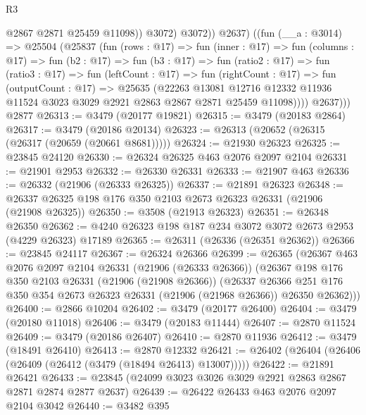 \begin{lexlean}{R3}
\begin{coremodule}
                  @2867
                  @2871
                  @25459
                  @11098))
              @3072)
            @3072))
          @2637)
        ((fun (__a : @3014) =>
        @25504
          (@25837
            (fun (rows : @17) =>
            fun (inner : @17) =>
            fun (columns : @17) =>
            fun (b2 : @17) =>
            fun (b3 : @17) =>
            fun (ratio2 : @17) =>
            fun (ratio3 : @17) =>
            fun (leftCount : @17) =>
            fun (rightCount : @17) =>
            fun (outputCount : @17) =>
            @25635
              (@22263
                @13081
                @12716
                @12332
                @11936
                @11524
                @3023
                @3029
                @2921
                @2863
                @2867
                @2871
                @25459
                @11098))))
          @2637)))
    @2877
@26313 := @3479 (@20177 @19821)
@26315 := @3479 (@20183 @2864)
@26317 := @3479 (@20186 @20134)
@26323 := @26313 (@20652 (@26315 (@26317 (@20659 (@20661 @8681)))))
@26324 := @21930 @26323
@26325 := @23845 @24120
@26330 := @26324 @26325 @463 @2076 @2097 @2104
@26331 := @21901 @2953
@26332 := @26330 @26331
@26333 := @21907 @463
@26336 := @26332 (@21906 (@26333 @26325))
@26337 := @21891 @26323
@26348 := @26337 @26325 @198 @176 @350 @2103 @2673 @26323 @26331 (@21906 (@21908 @26325))
@26350 := @3508 (@21913 @26323)
@26351 := @26348 @26350
@26362 := @4240 @26323 @198 @187 @234 @3072 @3072 @2673 @2953 (@4229 @26323) @17189
@26365 := @26311 (@26336 (@26351 @26362))
@26366 := @23845 @24117
@26367 := @26324 @26366
@26399 := @26365
    (@26367
      @463
      @2076
      @2097
      @2104
      @26331
      (@21906 (@26333 @26366))
      (@26367
        @198
        @176
        @350
        @2103
        @26331
        (@21906 (@21908 @26366))
        (@26337
          @26366
          @251
          @176
          @350
          @354
          @2673
          @26323
          @26331
          (@21906 (@21968 @26366))
          @26350
          @26362)))
@26400 := @2866 @10204
@26402 := @3479 (@20177 @26400)
@26404 := @3479 (@20180 @11018)
@26406 := @3479 (@20183 @11444)
@26407 := @2870 @11524
@26409 := @3479 (@20186 @26407)
@26410 := @2870 @11936
@26412 := @3479 (@18491 @26410)
@26413 := @2870 @12332
@26421 := @26402 (@26404 (@26406 (@26409 (@26412 (@3479 (@18494 @26413) @13007)))))
@26422 := @21891 @26421
@26433 := @23845 (@24099 @3023 @3026 @3029 @2921 @2863 @2867 @2871 @2874 @2877 @2637)
@26439 := @26422 @26433 @463 @2076 @2097 @2104 @3042
@26440 := @3482 @395

\end{coremodule}
\end{lexlean}
